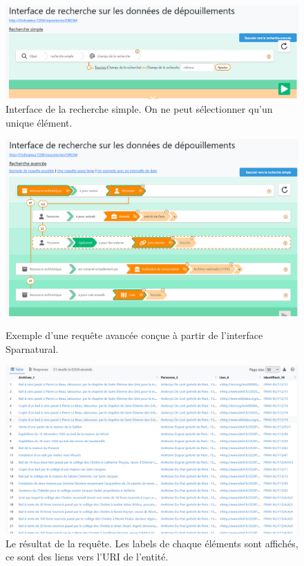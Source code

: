\begin{figure}[!h]
    \centering
    \includegraphics[width=1.1\linewidth]{images/recherche-simple.png}
    \caption{Interface de la recherche simple. On ne peut sélectionner qu'un unique élément.}
    \label{fig:recherche-simple}
\end{figure}
\begin{figure}[!ht]
    \centering
    \includegraphics[width=1\linewidth]{images/interface-oresm-exemple.png}
    \caption{Exemple d'une requête avancée conçue à partir de l'interface Sparnatural.}
    \label{fig:recherche-avancée}
    \centering
    \includegraphics[width=1\linewidth]{images/resultat-requete-sparnatural.png}
    \caption{Le résultat de la requête. Les labels de chaque éléments sont affichés, ce sont des liens vers l'URI de l'entité.}
    \label{fig:resultat-sparnatural}
\end{figure}

